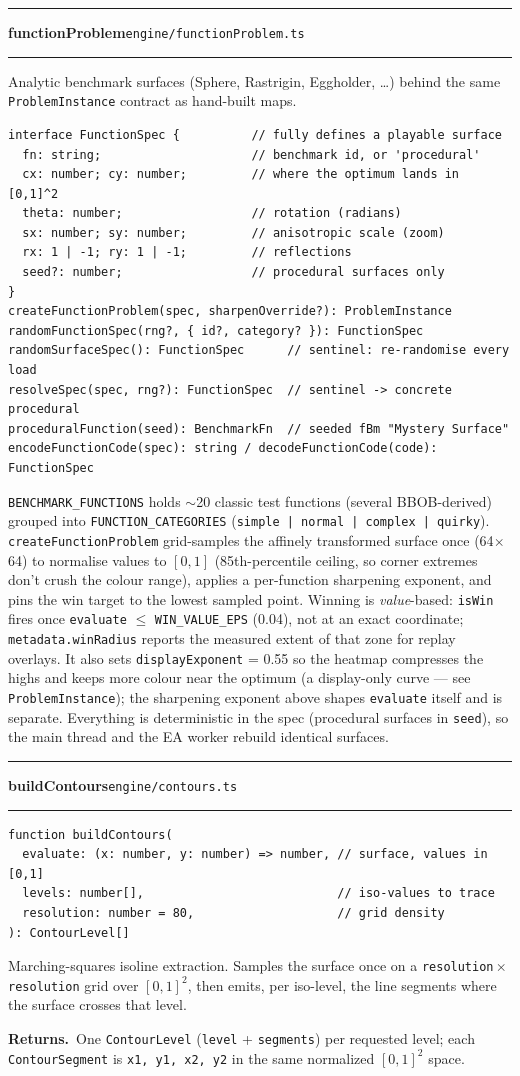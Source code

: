 \documentclass[11pt,a4paper]{report}
\newcommand{\srcfile}[1]{\texttt{\small #1}}   %
\newcommand{\ts}[1]{\texttt{#1}}               %
\newenvironment{apientry}[2]{%
  \par\medskip\noindent
  \begin{minipage}{\textwidth}
  \hrule\vspace{0.6ex}
  {\large\ttfamily\bfseries #1}\hfill{\footnotesize\srcfile{#2}}
  \vspace{0.4ex}\hrule\medskip
}{%
  \end{minipage}\par\medskip
}
\newcommand{\apifield}[1]{\par\smallskip\noindent\textbf{#1.}\ }
\begin{document}
\begin{apientry}{functionProblem}{engine/functionProblem.ts}
Analytic benchmark surfaces (Sphere, Rastrigin, Eggholder, \ldots) behind
the same \ts{ProblemInstance} contract as hand-built maps.
\begin{lstlisting}
interface FunctionSpec {          // fully defines a playable surface
  fn: string;                     // benchmark id, or 'procedural'
  cx: number; cy: number;         // where the optimum lands in [0,1]^2
  theta: number;                  // rotation (radians)
  sx: number; sy: number;         // anisotropic scale (zoom)
  rx: 1 | -1; ry: 1 | -1;         // reflections
  seed?: number;                  // procedural surfaces only
}
createFunctionProblem(spec, sharpenOverride?): ProblemInstance
randomFunctionSpec(rng?, { id?, category? }): FunctionSpec
randomSurfaceSpec(): FunctionSpec      // sentinel: re-randomise every load
resolveSpec(spec, rng?): FunctionSpec  // sentinel -> concrete procedural
proceduralFunction(seed): BenchmarkFn  // seeded fBm "Mystery Surface"
encodeFunctionCode(spec): string / decodeFunctionCode(code): FunctionSpec
\end{lstlisting}
\ts{BENCHMARK\_FUNCTIONS} holds $\sim$20 classic test functions (several
BBOB-derived) grouped into \ts{FUNCTION\_CATEGORIES}
(\ts{simple | normal | complex | quirky}). \ts{createFunctionProblem}
grid-samples the affinely transformed surface once (64$\times$64) to
normalise values to $[0,1]$ (85th-percentile ceiling, so corner extremes
don't crush the colour range), applies a per-function sharpening exponent,
and pins the win target to the lowest sampled point. Winning is
\emph{value}-based: \ts{isWin} fires once \ts{evaluate} $\leq$
\ts{WIN\_VALUE\_EPS} (0.04), not at an exact coordinate;
\ts{metadata.winRadius} reports the measured extent of that zone for
replay overlays. It also sets \ts{displayExponent} = 0.55 so the heatmap
compresses the highs and keeps more colour near the optimum (a display-only
curve --- see \ts{ProblemInstance}); the sharpening exponent above shapes
\ts{evaluate} itself and is separate. Everything is deterministic in the
spec (procedural surfaces in \ts{seed}), so the main thread and the EA
worker rebuild identical surfaces.
\end{apientry}

\begin{apientry}{buildContours}{engine/contours.ts}
\begin{lstlisting}
function buildContours(
  evaluate: (x: number, y: number) => number, // surface, values in [0,1]
  levels: number[],                           // iso-values to trace
  resolution: number = 80,                    // grid density
): ContourLevel[]
\end{lstlisting}
Marching-squares isoline extraction. Samples the surface once on a
\ts{resolution}\,$\times$\,\ts{resolution} grid over $[0,1]^2$, then
emits, per iso-level, the line segments where the surface crosses that
level.
\apifield{Returns}One \ts{ContourLevel} (\ts{level} + \ts{segments}) per
requested level; each \ts{ContourSegment} is \ts{x1, y1, x2, y2} in the
same normalized $[0,1]^2$ space.
\end{apientry}
\end{document}
